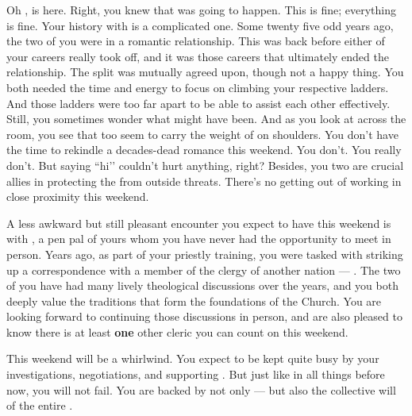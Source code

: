 \documentclass[char]{GL2020}
\begin{document}
Oh \cTechGod{}, \cDiplomat{} is here. Right, you knew that was going to happen. This is fine; everything is fine. Your history with \cDiplomat{} is a complicated one. Some twenty five odd years ago, the two of you were in a romantic relationship. This was back before either of your careers really took off, and it was those careers that ultimately ended the relationship. The split was mutually agreed upon, though not a happy thing. You both needed the time and energy to focus on climbing your respective ladders. And those ladders were too far apart to be able to assist each other effectively. Still, you sometimes wonder what might have been. And as you look at \cDiplomat{\them} across the room, you see that \cDiplomat{\they} too seem\cDiplomat{\verbs} to carry the weight of \pEarth{} on \cDiplomat{\their} shoulders. You don’t have the time to rekindle a decades-dead romance this weekend. You don’t. You really don’t. But saying ``hi’’ couldn’t hurt anything, right? Besides, you two are crucial allies in protecting the \pTech{} from outside threats. There’s no getting out of working in close proximity this weekend.

A less awkward but still pleasant encounter you expect to have this weekend is with \cHedonist{\full}, a pen pal of yours whom you have never had the opportunity to meet in person. Years ago, as part of your priestly training, you were tasked with striking up a correspondence with a member of the clergy of another nation — \cHedonist{}. The two of you have had many lively theological discussions over the years, and you both deeply value the traditions that form the foundations of the Church. You are looking forward to continuing those discussions in person, and are also pleased to know there is at least \textbf{one} other cleric you can count on this weekend.

This weekend will be a whirlwind. You expect to be kept quite busy by your investigations, negotiations, and supporting \cScholarship{}. But just like in all things before now, you will not fail. You are backed by not only \cTechGod{} — but also the collective will of the entire \pTech{}.
\end{document}
